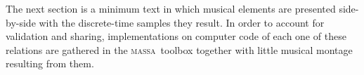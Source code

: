\documentclass[
 aip,
 jmp,
 amsmath,amssymb,
 reprint,
]{revtex4-1}
\newcommand{\massa}{{\large \textsc{massa}}}
\begin{document}
The next section is a minimum text in which musical elements are presented side-by-side with the discrete-time samples they result. In order to account for validation and sharing, implementations on computer code of each one of these relations are gathered in the \massa\ toolbox together with little musical montage resulting from them.





\end{document}
